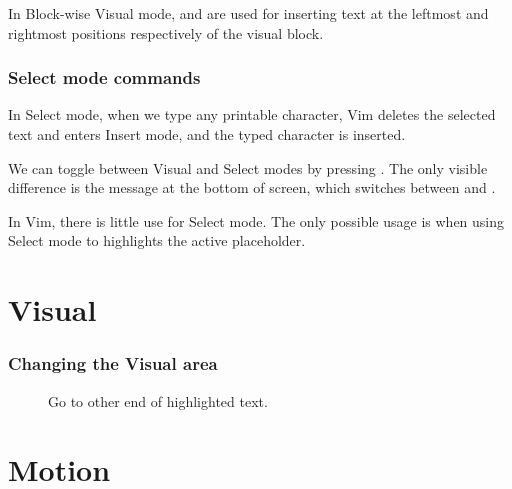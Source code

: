 In Block-wise Visual mode,  and  are used for inserting text at the leftmost and rightmost positions respectively of the visual block.


\section{Select mode commands}
In Select mode, when we type any printable character, Vim deletes the selected text and enters Insert mode, and the typed character is inserted.

We can toggle between Visual and Select modes by pressing .
The only visible difference is the message at the bottom of screen, which switches between  and .

In Vim, there is little use for Select mode.
The only possible usage is when using Select mode to highlights the active placeholder.
\part{Visual}
\section{Changing the Visual area}
\begin{description}
  \item[] Go to other end of highlighted text.
\end{description}
\part{Motion}
